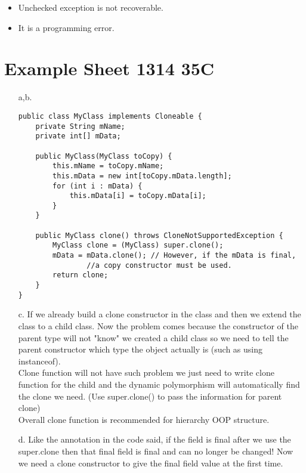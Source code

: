 \documentclass[10pt,twoside,a4paper]{article}
\begin{document}
\begin{itemize}
\item Unchecked exception is not recoverable.
\item It is a programming error.
\end{itemize}

\section{Example Sheet 1314 35C} 

\begin{enumerate}
\item[a,b.]
\begin{lstlisting}
public class MyClass implements Cloneable {
	private String mName;
	private int[] mData;

	public MyClass(MyClass toCopy) {
		this.mName = toCopy.mName;
		this.mData = new int[toCopy.mData.length];
		for (int i : mData) {
			this.mData[i] = toCopy.mData[i];
		}
	}

	public MyClass clone() throws CloneNotSupportedException {
		MyClass clone = (MyClass) super.clone();
		mData = mData.clone(); // However, if the mData is final, 
				//a copy constructor must be used.
		return clone;
	}
}
\end{lstlisting}
\item[c.]
If we already build a clone constructor in the class and then we extend the class to a child class. Now the problem comes because the constructor of the parent type will not "know" we created a child class so we need to tell the parent constructor which type the object actually is (such as using instanceof).\\ Clone function will not have such problem we just need to write clone function for the child and the dynamic polymorphism will automatically find the clone we need. (Use super.clone() to pass the information for parent clone)\\
Overall clone function is recommended for hierarchy OOP structure.
\item[d.]
Like the annotation in the code said, if the field is final after we use the super.clone then that final field is final and can no longer be changed! Now we need a clone constructor to give the final field value at the first time. 
\end{enumerate}
\end{document}

